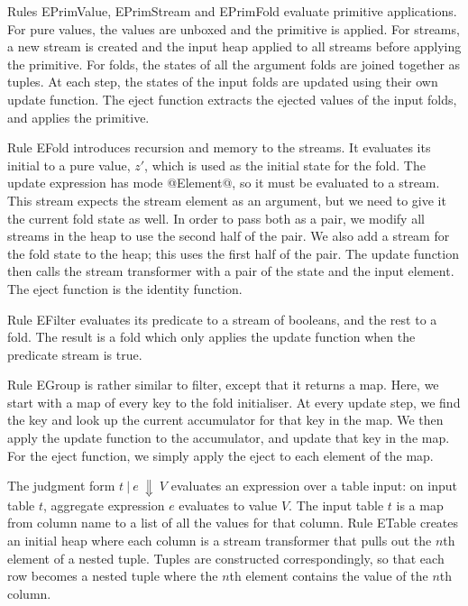 Rules EPrimValue, EPrimStream and EPrimFold evaluate primitive applications.
For pure values, the values are unboxed and the primitive is applied.
For streams, a new stream is created and the input heap applied to all streams before applying the primitive.
For folds, the states of all the argument folds are joined together as tuples.
At each step, the states of the input folds are updated using their own update function.
The eject function extracts the ejected values of the input folds, and applies the primitive.

Rule EFold introduces recursion and memory to the streams.
It evaluates its initial to a pure value, $z'$, which is used as the initial state for the fold.
The update expression has mode @Element@, so it must be evaluated to a stream.
This stream expects the stream element as an argument, but we need to give it the current fold state as well.
In order to pass both as a pair, we modify all streams in the heap to use the second half of the pair.
We also add a stream for the fold state to the heap; this uses the first half of the pair.
The update function then calls the stream transformer with a pair of the state and the input element.
The eject function is the identity function.

Rule EFilter evaluates its predicate to a stream of booleans, and the rest to a fold.
The result is a fold which only applies the update function when the predicate stream is true.

Rule EGroup is rather similar to filter, except that it returns a map.
Here, we start with a map of every key to the fold initialiser.
At every update step, we find the key and look up the current accumulator for that key in the map.
We then apply the update function to the accumulator, and update that key in the map.
For the eject function, we simply apply the eject to each element of the map.

The judgment form $t~|~e~\Downarrow~V$ evaluates an expression over a table input: on input table $t$, aggregate expression $e$ evaluates to value $V$.
The input table $t$ is a map from column name to a list of all the values for that column.
Rule ETable creates an initial heap where each column is a stream transformer that pulls out the $n$th element of a nested tuple.
Tuples are constructed correspondingly, so that each row becomes a nested tuple where the $n$th element contains the value of the $n$th column.

